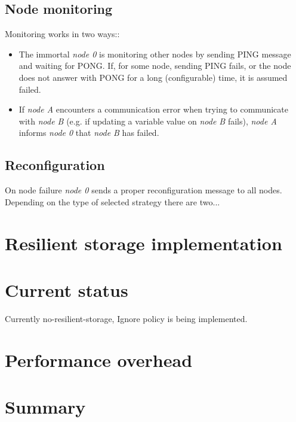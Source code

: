 \documentclass[12pt]{article}
\begin{document}
\subsection{Node monitoring}
Monitoring works in two ways::
\begin{itemize}
\item The immortal \textit{node 0} is monitoring other nodes by sending PING message and waiting for PONG.
If, for some node, sending PING fails, or the node does not answer with PONG for a long (configurable) time,
it is assumed failed.
\item
If \textit{node A} encounters a communication error when trying to communicate with \textit{node B}
(e.g. if updating a variable value on \textit{node B} fails), \textit{node A} informs \textit{node 0} that \textit{node B} has failed.

\end{itemize}

\subsection{Reconfiguration}
On node failure \textit{node 0} sends a proper reconfiguration message to all nodes.
Depending on the type of selected strategy there are two...

\section{Resilient storage implementation}

\section{Current status}
Currently no-resilient-storage, Ignore policy is being implemented.

\section{Performance overhead}

\section{Summary}
\end{document}
